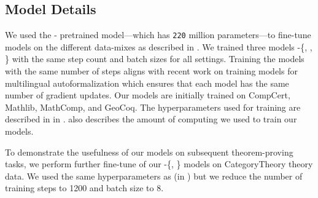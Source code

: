 \subsection{Model Details}
\label{sec:model-details}
We used the \codeTFive-\base\;\citep{wang2021codet5} pretrained model---which has \texttt{220} million parameters---to fine-tune models on the different data-mixes as described in .
We trained three models \proofwala-\{\multi, \coq, \lean\} with the same step count and batch sizes for all settings. Training the models with the same number of steps aligns with recent work on training models for multilingual autoformalization \citep{jiang2023multilingualmathematicalautoformalization} which ensures that each model has the same number of gradient updates. Our models are initially trained on CompCert, Mathlib, MathComp, and GeoCoq. The hyperparameters used for training are described in  in .  also describes the amount of computing we used to train our models. 

To demonstrate the usefulness of our models on subsequent theorem-proving tasks, we perform further fine-tune of our \proofwala-\{\multi, \coq\} models on CategoryTheory theory data. We used the same hyperparameters as  (in ) but we reduce the number of training steps to 1200 and batch size to 8.

